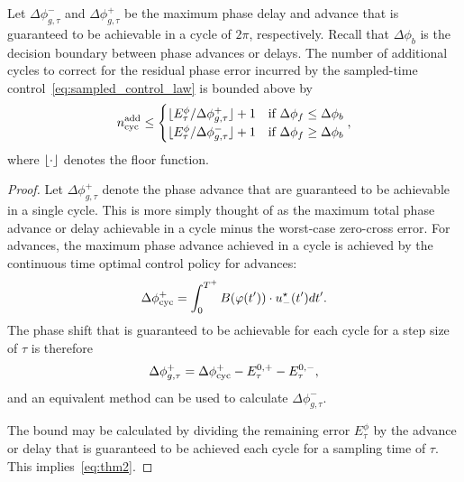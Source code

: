 \begin{thm}
    Let $\Delta\phi^-_{g,\tau}$ and $\Delta\phi^+_{g,\tau}$ be the maximum phase delay and advance that is guaranteed to be achievable in a cycle of $2\pi$, respectively. Recall that $\Delta\phi_b$ is the decision boundary between phase advances or delays.
    The number of additional cycles to correct for the residual phase error incurred by the sampled-time control~\eqref{eq:sampled_control_law} is bounded above by
    \begin{equation}\label{eq:thm2}
        n_{\rm cyc}^{\rm add} \leq \begin{cases}\lfloor E^{\phi}_\tau / \Delta\phi^+_{g,\tau}\rfloor+1 &\mbox{if } \Delta\phi_f \leq\Delta\phi_b \\
            \lfloor E^{\phi}_\tau/\Delta\phi^-_{g,\tau}\rfloor+1 & \mbox{if }\Delta\phi_f \geq\Delta\phi_b \end{cases},
\end{equation}
where $\lfloor\cdot\rfloor$ denotes the floor function.
\begin{proof}

Let $\Delta\phi^+_{g,\tau}$ denote the phase advance that are guaranteed to be achievable in a single cycle.
This is more simply thought of as the maximum total phase advance or delay achievable in a cycle minus the worst-case zero-cross error.
For advances, the maximum phase advance achieved in a cycle is achieved by the continuous time optimal control policy for advances:
\begin{equation}
    \Delta\phi^+_{\rm cyc} = \int_0^{T^+} B(\varphi(t'))\cdot u^\star_{-}(t')dt'.
\end{equation}
The phase shift that is guaranteed to be achievable for each cycle for a step size of $\tau$ is therefore
\begin{equation}
    \Delta\phi^+_{g,\tau} = \Delta\phi^+_{\rm cyc} - E^{0,+}_\tau - E^{0,-}_\tau,
\end{equation}
and an equivalent method can be used to calculate $\Delta\phi^-_{g,\tau}$.

The bound may be calculated by dividing the remaining error $E^{\phi}_\tau$ by the advance or delay that is guaranteed to be achieved each cycle for a sampling time of $\tau$. This implies~\eqref{eq:thm2}.
\end{proof}
\end{thm}



